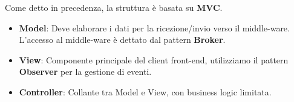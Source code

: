 \documentclass[a4paper]{article}
\begin{document}
Come detto in precedenza, la struttura è basata su \textbf{MVC}.

\begin{itemize}
    \item \textbf{Model}: Deve elaborare i dati per la ricezione/invio verso il middle-ware.\\L'accesso al middle-ware è dettato dal pattern \textbf{Broker}.
    \item \textbf{View}: Componente principale del client front-end, utilizziamo il pattern \textbf{Observer} per la gestione di eventi.
    \item \textbf{Controller}: Collante tra Model e View, con business logic limitata.
\end{itemize}


















\end{document}
